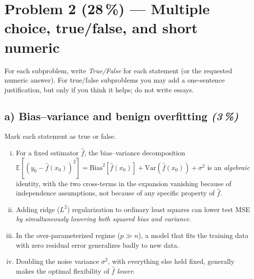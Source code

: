 \documentclass[11pt,a4paper]{article}
\newcommand{\points}[1]{\textbf{(#1\,\%)}}
\newcommand{\subpoints}[1]{\textit{(#1\,\%)}}
\begin{document}
\section*{Problem 2 \points{28} --- Multiple choice, true/false, and short numeric}

For each subproblem, write \emph{True/False} for each statement (or the requested numeric answer). For true/false subproblems you may add a one-sentence justification, but only if you think it helps; do not write essays.

\subsection*{a) Bias--variance and benign overfitting \subpoints{3}}
Mark each statement as true or false.
\begin{enumerate}[(i)]
  \item For a fixed estimator $\hat f$, the bias--variance decomposition
        $\mathbb{E}[(y_0-\hat f(x_0))^2]=\mathrm{Bias}^2[\hat f(x_0)]+\mathrm{Var}(\hat f(x_0))+\sigma^2$
        is an \emph{algebraic} identity, with the two cross-terms in the expansion vanishing because of independence assumptions, not because of any specific property of $\hat f$.
  \item Adding ridge ($L^2$) regularization to ordinary least squares can lower test MSE \emph{by simultaneously lowering both squared bias and variance}.
  \item In the over-parameterized regime ($p\gg n$), a model that fits the training data with zero residual error generalizes badly to new data.
  \item Doubling the noise variance $\sigma^2$, with everything else held fixed, generally makes the optimal flexibility of $\hat f$ \emph{lower}.
\end{enumerate}
\end{document}
